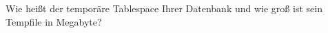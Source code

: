     \item Wie heißt der temporäre Tablespace Ihrer Datenbank und wie groß ist sein Tempfile in Megabyte?
